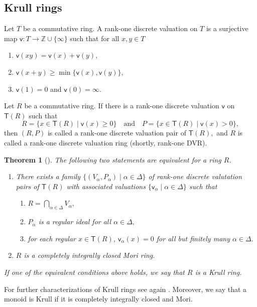 \documentclass[a4paper, 10pt]{amsart}
\newcommand{\defit}[1]{{\textsf{#1}}}
\theoremstyle{plain}
\newtheorem{theorem}{Theorem}[section]
\theoremstyle{definition}
\theoremstyle{remark}
\newcommand{\Z}{\mathbb Z}
\newcommand{\vv}{\mathsf{v}}
\numberwithin{equation}{section}
\begin{document}
\subsection{Krull rings} Let $T$ be a commutative ring.  A \defit{rank-one discrete valuation} on $T$ is a surjective map $\vv\colon T \to \Z\cup \{\infty\}$ such that for all $x,y\in T$ \begin{enumerate}[label=\textup(\roman*\textup)]
\item $\vv(xy)=\vv(x)+\vv(y)$,
\item $\vv(x+y)\ge \min\{\vv(x),\vv(y)\},$
\item $\vv(1)=0$ and $\vv(0)=\infty. $
\end{enumerate} Let $R$ be a commutative ring. If there is a rank-one discrete valuation $\vv$ on $\mathsf{T}(R)$ such that \[R=\{x\in \mathsf{T}(R)\mid \vv(x)\ge 0\}\quad \text{and}\quad P=\{x\in \mathsf{T}(R)\mid \vv(x)>0\},\] then $(R,P)$ is called a \defit{rank-one discrete valuation pair} of $\mathsf{T}(R),$ and $R$ is called a \defit{rank-one discrete valuation ring} (shortly, rank-one DVR).
\begin{theorem}[{\cite[Theorem 3.5]{CK21}}]
    The following two statements are equivalent for a ring $R$.
    \begin{enumerate}[label=\textup(\normalfont\alph*\textup)]
        \item There exists a family $\{(V_\alpha,P_\alpha)\mid \alpha \in \Delta\}$ of rank-one discrete valutation pairs of $\mathsf{T}(R)$ with associated valuations $\{\vv_\alpha\mid \alpha\in \Delta\}$ such that 
\begin{enumerate}[label=\textup(\normalfont\roman*\textup)]
    \item $R=\bigcap_{\alpha\in \Delta}V_\alpha,$
    \item $P_\alpha$ is a regular ideal for all $\alpha\in \Delta,$
    \item for each regular $x\in \mathsf{T}(R)$, $\vv_\alpha(x)=0$ for all but finitely many $\alpha\in \Delta.$
\end{enumerate}
\item $R$ is a completely integrally closed Mori ring.
    \end{enumerate} If one of the equivalent conditions above holds, we say that $R$ is a \textsf{Krull ring}.
\end{theorem} For further characterizations of Krull rings see again \cite[Theorem 3.5]{CK21}. Moreover, we say that a monoid is \defit{Krull} if it is completely integrally closed and Mori.
\end{document}

